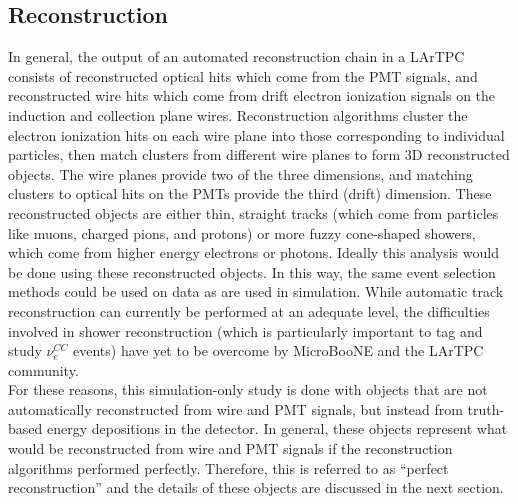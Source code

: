 \subsection{Reconstruction}
In general, the output of an automated reconstruction chain in a LArTPC consists of reconstructed optical hits which come from the PMT signals, and reconstructed wire hits which come from drift electron ionization signals on the induction and collection plane wires. Reconstruction algorithms cluster the electron ionization hits on each wire plane into those corresponding to individual particles, then match clusters from different wire planes to form 3D reconstructed objects. The wire planes provide two of the three dimensions, and matching clusters to optical hits on the PMTs provide the third (drift) dimension. These reconstructed objects are either thin, straight tracks (which come from particles like muons, charged pions, and protons) or more fuzzy cone-shaped showers, which come from higher energy electrons or photons. Ideally this analysis would be done using these reconstructed objects. In this way, the same event selection  methods could be used on data as are used in simulation. While automatic track reconstruction can currently be performed at an adequate level, the difficulties involved in shower reconstruction (which is particularly important to tag and study $\nu_e^{CC}$ events) have yet to be overcome by MicroBooNE and the LArTPC community.\\

For these reasons, this simulation-only study is done with objects that are not automatically reconstructed from wire and PMT signals, but instead from truth-based energy depositions in the detector. In general, these objects represent what would be reconstructed from wire and PMT signals if the reconstruction algorithms performed perfectly. Therefore, this is referred to as ``perfect reconstruction'' and the details of these objects are discussed in the next section. 

